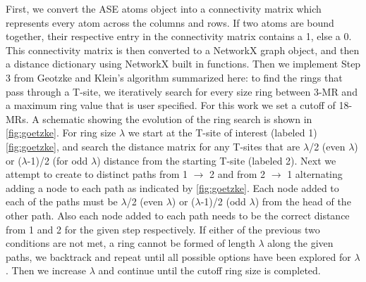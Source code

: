 \documentclass[preprint,numrefs,noinfo,sort&compress]{elsarticle}
\begin{document}
First, we convert the ASE atoms object into a connectivity matrix which represents every atom across the columns and rows. If two atoms are bound together, their respective entry in the connectivity matrix contains a 1, else a 0. This connectivity matrix is then converted to a NetworkX graph object, and then a distance dictionary using NetworkX built in functions. Then we implement Step 3 from Geotzke and Klein's algorithm \cite{goetzke-properties-1991} summarized here: to find the rings that pass through a T-site, we iteratively search for every size ring between 3-MR and a maximum ring value that is user specified. For this work we set a cutoff of 18-MRs. A schematic showing the evolution of the ring search is shown in \cref{fig:goetzke}. For ring size \(\lambda\) we start at the T-site of interest (labeled 1) \cref{fig:goetzke}, and search the distance matrix for any T-sites that are \(\lambda\)/2 (even \(\lambda\)) or (\(\lambda\)-1)/2 (for odd \(\lambda\)) distance from the starting T-site (labeled 2). Next we attempt to create to distinct paths from 1 \(\rightarrow\) 2 and from 2 \(\rightarrow\) 1 alternating adding a node to each path as indicated by \cref{fig:goetzke}. Each node added to each of the paths must be \(\lambda\)/2 (even \(\lambda\)) or (\(\lambda\)-1)/2 (odd \(\lambda\)) from the head of the other path. Also each node added to each path needs to be the correct distance from 1 and 2 for the given step respectively. If either of the previous two conditions are not met, a ring cannot be formed of length \(\lambda\) along the given paths, we backtrack and repeat until all possible options have been explored for \(\lambda\). Then we increase \(\lambda\) and continue until the cutoff ring size is completed.
\end{document}
